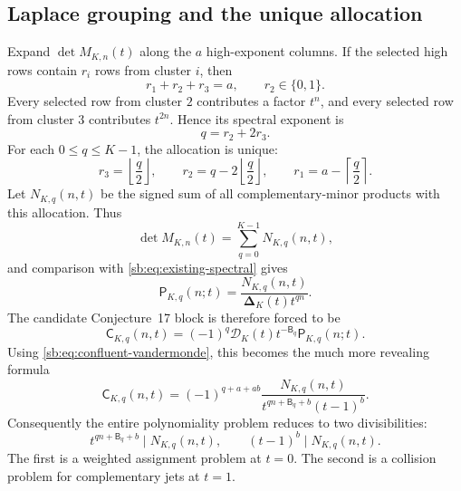 \documentclass[11pt]{article}
\theoremstyle{definition}
\theoremstyle{remark}
\newcommand{\Den}{\mathcal D}
\newcommand{\ConfDelta}{\boldsymbol\Delta}
\newcommand{\Cblock}{\mathsf C}
\newcommand{\Pblock}{\mathsf P}
\newcommand{\Btri}{\mathsf B}
\theoremstyle{definition}
\theoremstyle{plain}
\numberwithin{equation}{section}
\begin{document}
\subsection{Laplace grouping and the unique allocation}
Expand $\det M_{K,n}(t)$ along the $a$ high-exponent columns.  If the selected
high rows contain $r_i$ rows from cluster $i$, then
\begin{equation}
 r_1+r_2+r_3=a,
 \qquad r_2\in\{0,1\}.
 \label{sb:eq:allocation-constraints}
\end{equation}
Every selected row from cluster $2$ contributes a factor $t^n$, and every
selected row from cluster $3$ contributes $t^{2n}$.  Hence its spectral
exponent is
\begin{equation}
 q=r_2+2r_3.
 \label{sb:eq:q-allocation}
\end{equation}
For each $0\le q\le K-1$, the allocation is unique:
\begin{equation}
 r_3=\left\lfloor\frac q2\right\rfloor,
 \qquad
 r_2=q-2\left\lfloor\frac q2\right\rfloor,
 \qquad
 r_1=a-\left\lceil\frac q2\right\rceil.
 \label{sb:eq:unique-allocation}
\end{equation}
Let $N_{K,q}(n,t)$ be the signed sum of all complementary-minor products with
this allocation.  Thus
\begin{equation}
 \det M_{K,n}(t)=\sum_{q=0}^{K-1}N_{K,q}(n,t),
 \label{sb:eq:N-sum}
\end{equation}
and comparison with \eqref{sb:eq:existing-spectral} gives
\begin{equation}
 \Pblock_{K,q}(n;t)
 =\frac{N_{K,q}(n,t)}{\ConfDelta_K(t)t^{qn}}.
 \label{sb:eq:P-via-N}
\end{equation}
The candidate Conjecture~17 block is therefore forced to be
\begin{equation}
 \Cblock_{K,q}(n,t)=(-1)^q\Den_K(t)t^{-\Btri_q}
 \Pblock_{K,q}(n;t).
 \label{sb:eq:C-definition}
\end{equation}
Using \eqref{sb:eq:confluent-vandermonde}, this becomes the much more revealing
formula
\begin{equation}
 \boxed{\displaystyle
 \Cblock_{K,q}(n,t)=
 (-1)^{q+a+ab}
 \frac{N_{K,q}(n,t)}
 {t^{qn+\Btri_q+b}(t-1)^b}.}
 \label{sb:eq:C-quotient}
\end{equation}
Consequently the entire polynomiality problem reduces to two divisibilities:
\begin{equation}
 t^{qn+\Btri_q+b}\mid N_{K,q}(n,t),
 \qquad
 (t-1)^b\mid N_{K,q}(n,t).
 \label{sb:eq:two-divisibilities}
\end{equation}
The first is a weighted assignment problem at $t=0$.  The second is a
collision problem for complementary jets at $t=1$.
\end{document}
